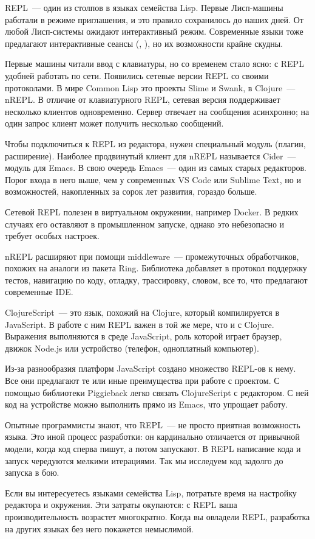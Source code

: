 REPL~--- один из столпов в языках семейства Lisp. Первые Лисп-машины работали в режиме приглашения, и это правило сохранилось до наших дней. От любой Лисп-системы ожидают интерактивный режим. Современные языки тоже предлагают интерактивные сеансы (, ), но их возможности крайне скудны.

Первые машины читали ввод с клавиатуры, но со временем стало ясно: с REPL удобней работать по сети. Появились сетевые версии REPL со своими протоколами. В мире Common Lisp это проекты Slime и Swank, в Clojure~--- nREPL. В отличие от клавиатурного REPL, сетевая версия поддерживает несколько клиентов одновременно. Сервер отвечает на сообщения асинхронно; на один запрос клиент может получить несколько сообщений.

Чтобы подключиться к REPL из редактора, нужен специальный модуль (плагин, расширение). Наиболее продвинутый клиент для nREPL называется Cider~--- модуль для Emacs. В свою очередь Emacs~--- один из самых старых редакторов. Порог входа в него выше, чем у современных VS Code или Sublime Text, но и возможностей, накопленных за сорок лет развития, гораздо больше.

Сетевой REPL полезен в виртуальном окружении, например Docker. В редких случаях его оставляют в промышленном запуске, однако это небезопасно и требует особых настроек.

nREPL расширяют при помощи middleware~--- промежуточных обработчиков, похожих на аналоги из пакета Ring. Библиотека  добавляет в протокол поддержку тестов, навигацию по коду, отладку, трассировку, словом, все то, что предлагают современные IDE.

ClojureScript~--- это язык, похожий на Clojure, который компилируется в JavaScript. В работе с ним REPL важен в той же мере, что и с Clojure. Выражения выполняются в среде JavaScript, роль которой играет браузер, движок Node.js или устройство (телефон, одноплатный компьютер).

Из-за разнообразия платформ JavaScript создано множество REPL-ов к нему. Все они предлагают те или иные преимущества при работе с проектом. С помощью библиотеки Piggieback легко связать ClojureScript с редактором. С ней код на устройстве можно выполнить прямо из Emacs, что упрощает работу.

Опытные программисты знают, что REPL~--- не просто приятная возможность языка. Это иной процесс разработки: он кардинально отличается от привычной модели, когда код сперва пишут, а потом запускают. В REPL написание кода и запуск чередуются мелкими итерациями. Так мы исследуем код задолго до запуска в бою.

Если вы интересуетесь языками семейства Lisp, потратьте время на настройку редактора и окружения. Эти затраты окупаются: с REPL ваша производительность возрастет многократно. Когда вы овладели REPL, разработка на других языках без него покажется немыслимой.
